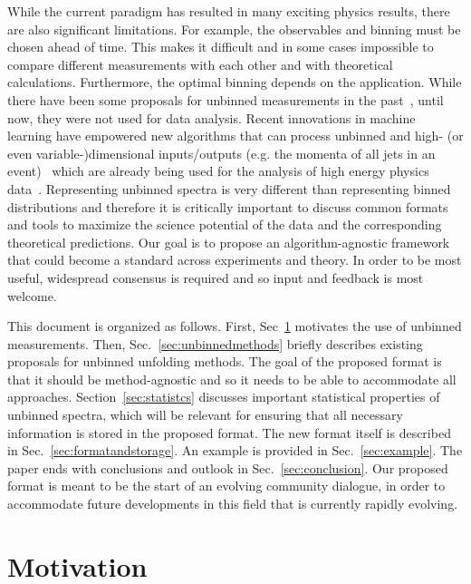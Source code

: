 \documentclass[a4paper,11pt]{article}
\begin{document}
While the current paradigm has resulted in many exciting physics results, there are also significant limitations.   For example, the observables and binning must be chosen ahead of time.  This makes it difficult and in some cases impossible to compare different measurements with each other and with theoretical calculations.  Furthermore, the optimal binning depends on the application.  While there have been some proposals for unbinned measurements in the past~\cite{Lindemann:1995ut,Aslan:2003vu,DEMBINSKI2013410}, until now, they were not used for data analysis.  Recent innovations in machine learning have empowered new algorithms that can process unbinned and high- (or even variable-)dimensional inputs/outputs (e.g. the momenta of all jets in an event)~\cite{Gagunashvili:2010zw,Glazov:2017vni,Datta:2018mwd,Andreassen:2019cjw,Bellagente:2020piv,Bellagente:2019uyp,Andreassen:2021zzk,bunse2018unification,Ruhe2019MiningFS, Howard:2021pos,Vandegar:2020yvw} which are already being used for the analysis of high energy physics data~\cite{2108.12376}.  Representing unbinned spectra is very different than representing binned distributions and therefore it is critically important to discuss common formats and tools to maximize the science potential of the data and the corresponding theoretical predictions.  Our goal is to propose an algorithm-agnostic framework that could become a standard across experiments and theory.  In order to be most useful, widespread consensus is required and so input and feedback is most welcome.

This document is organized as follows. 
%
First, Sec~\ref{sec:motivation} motivates the use of unbinned measurements.
%
Then, Sec.~\ref{sec:unbinnedmethods} briefly describes existing proposals for unbinned unfolding methods.  The goal of the proposed format is that it should be method-agnostic and so it needs to be able to accommodate all approaches. 
%
Section~\ref{sec:statistcs} discusses important statistical properties of unbinned spectra, which will be relevant for ensuring that all necessary information is stored in the proposed format.  The new format itself is described in Sec.~\ref{sec:formatandstorage}.   An example is provided in Sec.~\ref{sec:example}.  The paper ends with conclusions and outlook in Sec.~\ref{sec:conclusion}.  Our proposed format is meant to be the start of an evolving community dialogue, in order to accommodate future developments in this field that is currently rapidly evolving.

\section{Motivation}
\label{sec:motivation}
\end{document}
